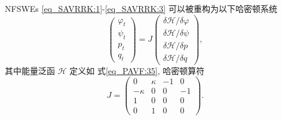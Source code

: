 \begin{theorem}\label{thm_PAVF:2}
	NFSWEs \eqref{eq_SAVRRK:1}-\eqref{eq_SAVRRK:3} 可以被重构为以下哈密顿系统
\begin{equation}\label{eq_PAVF:37}
	\left(\begin{array}{l}
		\varphi_{t} \\
		\psi_{t} \\
		p_{t} \\
		q_{t}
		\end{array}\right)=J\left(\begin{array}{l}
		\delta \mathcal{H} / \delta \varphi \\
		\delta \mathcal{H} / \delta \psi \\
		\delta \mathcal{H} / \delta p \\
		\delta \mathcal{H} / \delta q
		\end{array}\right),
\end{equation}
其中能量泛函 $\mathcal{H}$ 定义如 式\eqref{eq_PAVF:35}, 哈密顿算符
\begin{equation}\label{eq_PAVF:37b}
J=\left(\begin{array}{cccc}
		0 & \kappa & -1 & 0 \\
		-\kappa & 0 & 0 & -1 \\
		1 & 0 & 0 & 0 \\
		0 & 1 & 0 & 0
		\end{array}\right).
\end{equation}
\end{theorem}

